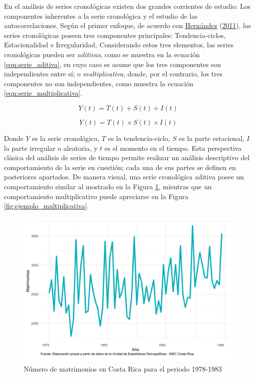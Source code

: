 \documentclass[
]{article}
\begin{document}
En el análisis de series cronológicas existen dos grandes corrientes de
estudio: Los componentes inherentes a la serie cronológica y el estudio
de las autocorrelaciones. Según el primer enfoque, de acuerdo con
\protect\hyperlink{ref-oscarh-1}{Hernández}
(\protect\hyperlink{ref-oscarh-1}{2011}), las series cronológicas poseen
tres componentes principales: Tendencia-ciclos, Estacionalidad e
Irregularidad. Considerando estos tres elementos, las series
cronológicas pueden ser \emph{aditivas}, como se muestra en la ecuación
\ref{eqn:serie_aditiva}, en cuyo caso se asume que los tres componentes
son independientes entre sí; o \emph{multiplicativa}, donde, por el
contrario, los tres componentes no son independientes, como muestra la
ecuación \ref{eqn:serie_multiplicativa}.

\begin{equation}
\label{eqn:serie_aditiva}
Y(t)=T(t)+S(t)+I(t)
\end{equation}

\begin{equation}
\label{eqn:serie_multiplicativa}
Y(t)=T(t)\times S(t)\times I(t)
\end{equation}

Donde \(Y\) es la serie cronológica, \(T\) es la tendencia-ciclo, \(S\)
es la parte estacional, \(I\) la parte irregular o aleatoria, y \(t\) es
el momento en el tiempo. Esta perspectiva clásica del análisis de series
de tiempo permite realizar un análisis descriptivo del comportamiento de
la serie en cuestión; cada una de sus partes se definen en posteriores
apartados. De manera visual, una serie cronológica aditiva posee un
comportamiento similar al mostrado en la Figura
\ref{fig:ejemplo_aditiva}, mientras que un comportamiento multiplicativo
puede apreciarse en la Figura \ref{fig:ejemplo_multiplicativa}.

\begin{figure}[H]
\includegraphics[width=1\linewidth,height=1\textheight]{Tesis_files/figure-latex/ejemplo_aditiva-1} \caption{Número de matrimonios en Costa Rica para el periodo 1978-1983}\label{fig:ejemplo_aditiva}
\end{figure}
\end{document}
